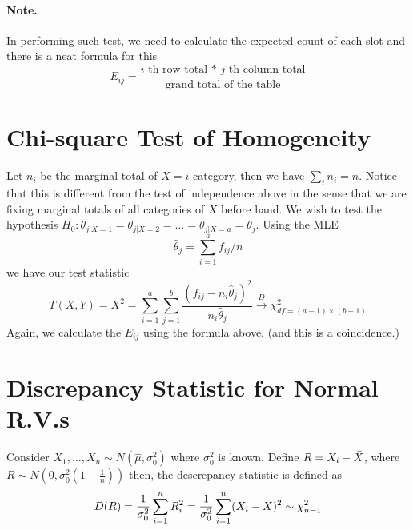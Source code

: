\documentclass{article}
\begin{document}
\paragraph{Note.} In performing such test, we need to calculate the expected count of each slot and there is a neat formula for this
\begin{equation*}
    E_{ij} = \frac{i\text{-th row total * $j$-th column total}}{\text{grand total of the table}}
\end{equation*}

\section{Chi-square Test of Homogeneity}
Let $n_i$ be the marginal total of $X=i$ category, then we have $\sum_i n_i = n$. Notice that this is different
from the test of independence above in the sense that we are fixing marginal totals of all categories of $X$ before hand.
We wish to test the hypothesis $H_0: \theta_{j|X=1} = \theta_{j|X=2} =\ldots= \theta_{j|X=a} = \theta_j$. Using the MLE
\begin{equation*}
    \hat{\theta}_j = \sum_{i=1}^a f_{ij}/n
\end{equation*}
we have our test statistic
\begin{equation*}
    T(X,Y) = X^2 = \sum_{i=1}^a\sum_{j=1}^b \frac{\left(f_{ij} - n_i\hat{\theta}_{j}\right)^2}{n_i\hat{\theta}_{j}} \xrightarrow{D} \chi^2_{df=(a-1)\times(b-1)}
\end{equation*}
Again, we calculate the $E_{ij}$ using the formula above. (and this is a coincidence.)


\section{Discrepancy Statistic for Normal R.V.s}
Consider $X_1,\ldots,X_n\sim N(\hat{\mu}, \sigma_0^2)$ where $\sigma_0^2$ is known. Define $R = X_i - \Bar{X}$, where $R\sim N(0, \sigma_0^2 (1 - \frac{1}{n}))$ then, the descrepancy statistic is defined as
\begin{equation*}
    D(R) = \frac{1}{\sigma_0^2}\sum_{i = 1}^n R_i^2 =  \frac{1}{\sigma_0^2}\sum_{i=1}^n(X_i - \Bar{X})^2 \sim \chi^2_{n-1}
\end{equation*}
\end{document}
